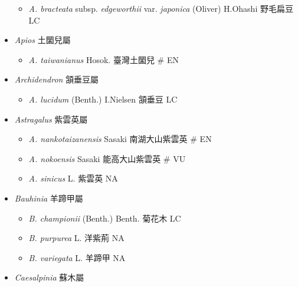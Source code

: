 \begin{itemize}
  \begin{itemize}
        \item[] \textit{A. bracteata} subsp. \textit{edgeworthii} var. \textit{japonica} (Oliver) H.Ohashi  野毛扁豆   LC
  \end{itemize}
 \item[] \textit{Apios} 土圞兒屬
                                
  \begin{itemize}
        \item[] \textit{A. taiwanianus} Hosok.  臺灣土圞兒  \# EN
  \end{itemize}
 \item[] \textit{Archidendron} 頷垂豆屬
                                
  \begin{itemize}
        \item[] \textit{A. lucidum} (Benth.) I.Nielsen  頷垂豆   LC
  \end{itemize}
 \item[] \textit{Astragalus} 紫雲英屬
                                
  \begin{itemize}
        \item[] \textit{A. nankotaizanensis} Sasaki  南湖大山紫雲英  \# EN
        \item[] \textit{A. nokoensis} Sasaki  能高大山紫雲英  \# VU
        \item[] \textit{A. sinicus} L.  紫雲英   NA
  \end{itemize}
 \item[] \textit{Bauhinia} 羊蹄甲屬
                                
  \begin{itemize}
        \item[] \textit{B. championii} (Benth.) Benth.  菊花木   LC
        \item[] \textit{B. purpurea} L.  洋紫荊   NA
        \item[] \textit{B. variegata} L.  羊蹄甲   NA
  \end{itemize}
 \item[] \textit{Caesalpinia} 蘇木屬
                                

\end{itemize}
